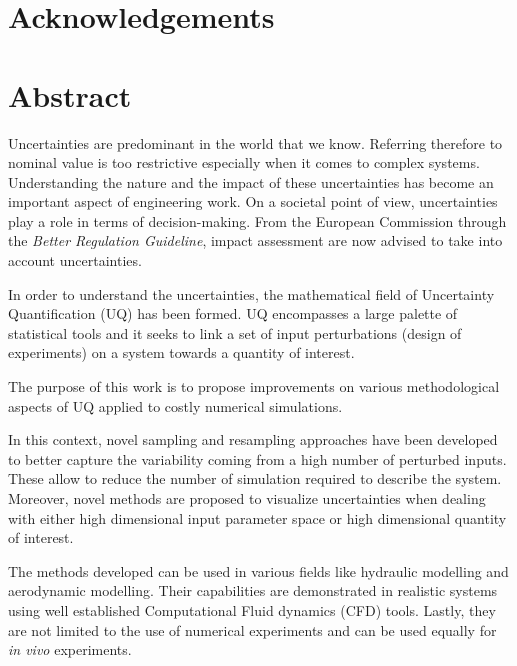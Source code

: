 
\cleardoublepage
\section*{Acknowledgements}





\newpage
\section*{Abstract}

Uncertainties are predominant in the world that we know. Referring therefore to nominal value is too restrictive especially when it comes to complex systems. Understanding the nature and the impact of these uncertainties has become an important aspect of engineering work. On a societal point of view, uncertainties play a role in terms of decision-making. From the European Commission through the \emph{Better Regulation Guideline}, impact assessment are now advised to take into account uncertainties.

In order to understand the uncertainties, the mathematical field of Uncertainty Quantification (UQ) has been formed. UQ encompasses a large palette of statistical tools and it seeks to link a set of input perturbations (design of experiments) on a system towards a quantity of interest.

The purpose of this work is to propose improvements on various methodological aspects of UQ applied to costly numerical simulations. 


In this context, novel sampling and resampling approaches have been developed to better capture the variability coming from a high number of perturbed inputs. These allow to reduce the number of simulation required to describe the system. Moreover, novel methods are proposed to visualize uncertainties when dealing with either high dimensional input parameter space or high dimensional quantity of interest.

The methods developed can be used in various fields like hydraulic modelling and aerodynamic modelling. Their capabilities are demonstrated in realistic systems using well established Computational Fluid dynamics (CFD) tools. Lastly, they are not limited to the use of numerical experiments and can be used equally for \emph{in vivo} experiments.

